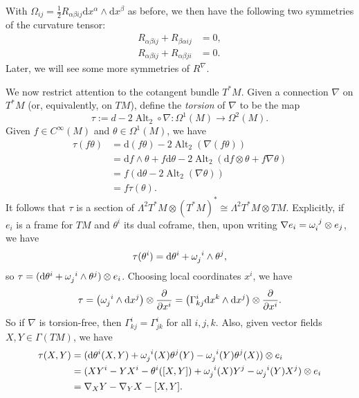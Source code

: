 \documentclass{book}
\renewcommand{\d}{\mathrm{d}}
\newcommand{\parens}[1]{\left( {#1} \right)}
\newcommand{\pdv}[2]{\frac{\partial{#1}}{\partial{#2}}}
\DeclareMathOperator{\Alt}{\mathrm{Alt}}
\theoremstyle{definition}
\numberwithin{equation}{section}
\begin{document}
With $\Omega_{ij} = \frac{1}{2} R_{\alpha\beta ij} \d x^\alpha \wedge \d x^\beta$ as before, we then have the following two symmetries of the curvature tensor:
\begin{align}
    R_{\alpha\beta ij} + R_{\beta\alpha ij} &= 0, \\
    R_{\alpha\beta ij} + R_{\alpha\beta ji} &= 0.
\end{align}
Later, we will see some more symmetries of $R^\nabla$.

We now restrict attention to the cotangent bundle $T^*M$. Given a connection $\nabla$ on $T^*M$ (or, equivalently, on $TM$), define the \textit{torsion} of $\nabla$ to be the map 
\begin{equation}
    \tau := d - 2 \Alt_2 \circ \nabla \colon \Omega^1(M) \to \Omega^2(M).
\end{equation}
Given $f \in C^\infty(M)$ and $\theta \in \Omega^1(M)$, we have 
\begin{equation} \begin{aligned}
    \tau(f\theta) &= \d(f\theta) - 2\Alt_2(\nabla(f\theta)) \\
                  &= \d f \wedge \theta + f \d\theta - 2\Alt_2(\d f \otimes \theta + f \nabla \theta) \\
                  &= f (\d\theta - 2\Alt_2(\nabla\theta)) \\
                  &= f\tau(\theta).
\end{aligned} \end{equation}
It follows that $\tau$ is a section of $\Lambda^2 T^*M \otimes (T^*M)^* \cong \Lambda^2 T^*M \otimes TM$. Explicitly, if $e_i$ is a frame for $TM$ and $\theta^i$ its dual coframe, then, upon writing $\nabla e_i = \tensor{\omega}{_i^j} \otimes e_j$, we have
\begin{equation}
    \tau(\theta^i) = \d\theta^i + \tensor{\omega}{_j^i} \wedge \theta^j,
\end{equation}
so $\tau = ( \d\theta^i + \tensor{\omega}{_j^i} \wedge \theta^j ) \otimes e_i$. Choosing local coordinates $x^i$, we have
\begin{equation}
    \tau = \parens{ \tensor{\omega}{_j^i} \wedge \d x^j } \otimes \pdv{}{x^i} = \parens{ \Gamma^i_{kj} \d x^k \wedge \d x^j } \otimes \pdv{}{x^i}.
\end{equation}
So if $\nabla$ is torsion-free, then $\Gamma^i_{kj} = \Gamma^i_{jk}$ for all $i,j,k$. Also, given vector fields $X,Y \in \Gamma(TM)$, we have 
\begin{equation} \begin{aligned}
    \tau(X,Y) &= ( \d\theta^i(X,Y) + \tensor{\omega}{_j^i}(X)\theta^j(Y) - \tensor{\omega}{_j^i}(Y)\theta^j(X) ) \otimes e_i \\
              &= ( XY^i - YX^i - \theta^i([X,Y]) + \tensor{\omega}{_j^i}(X) Y^j - \tensor{\omega}{_j^i}(Y) X^j ) \otimes e_i \\
              &= \nabla_X Y - \nabla_Y X - [X,Y].
\end{aligned} \end{equation}
\end{document}
